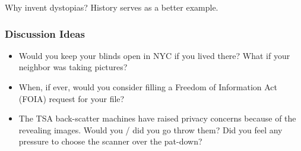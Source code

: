 \documentclass{beamer}
\begin{document}
\begin{frame}
\begin{columns}[c]
\begin{figure}
    \end{figure}

    \end{columns}

\begin{block}{Why invent dystopias?}
      History serves as a better example.
\end{block}


\end{frame}

\begin{frame}
\frametitle{Discussion Ideas}

\begin{itemize}
\item Would you keep your blinds open in NYC if you lived there?  What
  if your neighbor was taking pictures?
\item When, if ever, would you consider filling a Freedom of
  Information Act (FOIA) request for your file?
\item The TSA back-scatter machines have raised privacy concerns
  because of the revealing images.  Would you / did you go throw them?
  Did you feel any pressure to choose the scanner over the pat-down?

\end{itemize}

\end{frame}
\end{document}
